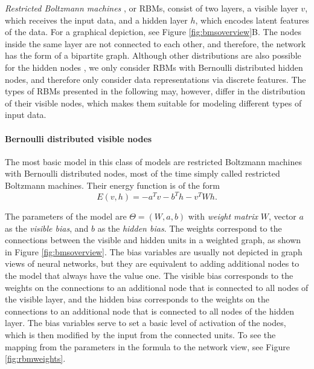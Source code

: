 \documentclass[12pt]{article}
\begin{document}
\emph{Restricted Boltzmann machines} \citep{smolensky1986foundations}, or RBMs,  consist of two layers, a visible layer $v$, which receives the input data, and a hidden layer $h$, which encodes latent features of the data. For a graphical depiction, see Figure \ref{fig:bmsoverview}B.
The nodes inside the same layer are not connected to each other, and therefore, the network has the form of a bipartite graph.
Although other distributions are also possible for the hidden nodes \citep{hinton_practical_2012}, we only consider RBMs with Bernoulli distributed hidden nodes, and therefore only consider data representations via discrete features.
The types of RBMs presented in the following may, however, differ in the distribution of their visible nodes, which makes them suitable for modeling different types of input data.

\paragraph{Bernoulli distributed visible nodes}
The most basic model in this class of models are restricted Boltzmann machines with Bernoulli distributed nodes, most of the time simply called restricted Boltzmann machines. Their energy function is of the form
\begin{equation}
   E(v,h) = - a^T v - b^T h - v^T W h. \label{eqn:energyformularbm}
\end{equation}

The parameters of the model are $\Theta = (W, a, b)$ with \emph{weight matrix} $W$, vector $a$ as the \emph{visible bias}, and $b$ as the \emph{hidden bias}.
The weights correspond to the connections between the visible and hidden units in a weighted graph, as shown in Figure \ref{fig:bmsoverview}.
The bias variables are usually not depicted in graph views of neural networks, but they are equivalent to adding additional nodes to the model that always have the value one. The visible bias corresponds to the weights on the connections to an additional node that is connected to all nodes of the visible layer, and the hidden bias corresponds to the weights on the connections to an additional node that is connected to all nodes of the hidden layer. The bias variables serve to set a basic level of activation of the nodes, which is then modified by the input from the connected units.
To see the mapping from the parameters in the formula to the network view, see Figure \ref{fig:rbmweights}.
\end{document}
